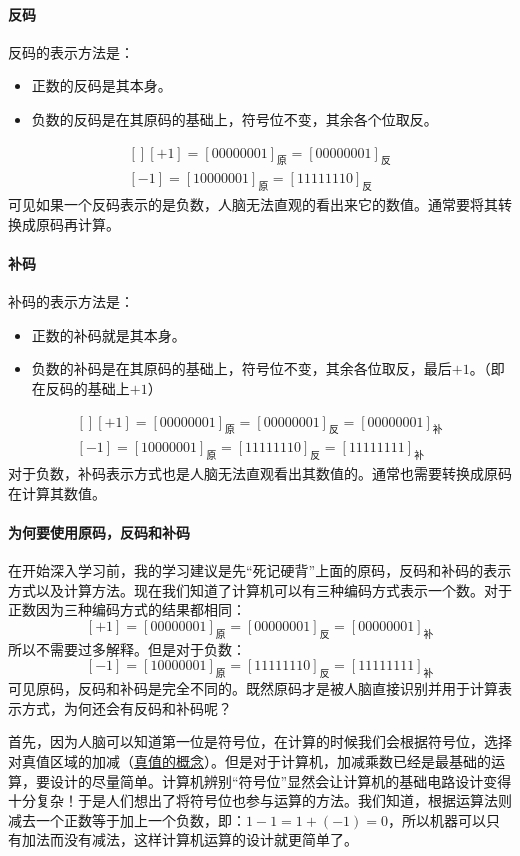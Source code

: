 \paragraph*{反码}
反码的表示方法是：
\begin{itemize}
\item 正数的反码是其本身。
\item 负数的反码是在其原码的基础上，符号位不变，其余各个位取反。
\end{itemize}
$$\begin{aligned}[]
[+1]=[00000001]_{\textrm{原}}=[00000001]_{\textrm{反}}\\
[-1]=[10000001]_{\textrm{原}}=[11111110]_{\textrm{反}}
\end{aligned}$$
可见如果一个反码表示的是负数，人脑无法直观的看出来它的数值。通常要将其转换成原码再计算。

\paragraph*{补码}
补码的表示方法是：
\begin{itemize}
\item 正数的补码就是其本身。
\item 负数的补码是在其原码的基础上，符号位不变，其余各位取反，最后$+1$。（即在反码的基础上$+1$）
\end{itemize}
$$\begin{aligned}[]
[+1]=[00000001]_{\textrm{原}}=[00000001]_{\textrm{反}}=[00000001]_{\textrm{补}}\\
[-1]=[10000001]_{\textrm{原}}=[11111110]_{\textrm{反}}=[11111111]_{\textrm{补}}
\end{aligned}$$
对于负数，补码表示方式也是人脑无法直观看出其数值的。通常也需要转换成原码在计算其数值。

\paragraph*{为何要使用原码，反码和补码}
在开始深入学习前，我的学习建议是先“死记硬背”上面的原码，反码和补码的表示方式以及计算方法。现在我们知道了计算机可以有三种编码方式表示一个数。对于正数因为三种编码方式的结果都相同：
$$[+1]=[00000001]_{\textrm{原}}=[00000001]_{\textrm{反}}=[00000001]_{\textrm{补}}$$
所以不需要过多解释。但是对于负数：
$$[-1]=[10000001]_{\textrm{原}}=[11111110]_{\textrm{反}}=[11111111]_{\textrm{补}}$$
可见原码，反码和补码是完全不同的。既然原码才是被人脑直接识别并用于计算表示方式，为何还会有反码和补码呢？

首先，因为人脑可以知道第一位是符号位，在计算的时候我们会根据符号位，选择对真值区域的加减（\hyperref[sec6]{真值的概念}）。但是对于计算机，加减乘数已经是最基础的运算，要设计的尽量简单。计算机辨别“符号位”显然会让计算机的基础电路设计变得十分复杂！于是人们想出了将符号位也参与运算的方法。我们知道，根据运算法则减去一个正数等于加上一个负数，即：$1-1=1+(-1)=0$，所以机器可以只有加法而没有减法，这样计算机运算的设计就更简单了。

